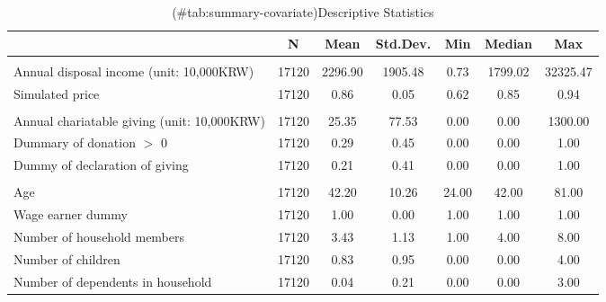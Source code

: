 \begin{table}

\caption{(\#tab:summary-covariate)Descriptive Statistics}
\centering
\fontsize{8}{10}\selectfont
\begin{threeparttable}
\begin{tabular}[t]{lcccccc}
\toprule
  & N & Mean & Std.Dev. & Min & Median & Max\\
\midrule
\addlinespace[0.3em]
\multicolumn{7}{l}{\textit{Income and giving price}}\\
\hspace{1em}Annual disposal income (unit: 10,000KRW) & 17120 & \num{2296.90} & \num{1905.48} & \num{0.73} & \num{1799.02} & \num{32325.47}\\
\hspace{1em}Simulated price & 17120 & \num{0.86} & \num{0.05} & \num{0.62} & \num{0.85} & \num{0.94}\\
\addlinespace[0.3em]
\multicolumn{7}{l}{\textit{Charitable giving}}\\
\hspace{1em}Annual chariatable giving (unit: 10,000KRW) & 17120 & \num{25.35} & \num{77.53} & \num{0.00} & \num{0.00} & \num{1300.00}\\
\hspace{1em}Dummary of donation $>$ 0 & 17120 & \num{0.29} & \num{0.45} & \num{0.00} & \num{0.00} & \num{1.00}\\
\hspace{1em}Dummy of declaration of giving & 17120 & \num{0.21} & \num{0.41} & \num{0.00} & \num{0.00} & \num{1.00}\\
\addlinespace[0.3em]
\multicolumn{7}{l}{\textit{Demographics}}\\
\hspace{1em}Age & 17120 & \num{42.20} & \num{10.26} & \num{24.00} & \num{42.00} & \num{81.00}\\
\hspace{1em}Wage earner dummy & 17120 & \num{1.00} & \num{0.00} & \num{1.00} & \num{1.00} & \num{1.00}\\
\hspace{1em}Number of household members & 17120 & \num{3.43} & \num{1.13} & \num{1.00} & \num{4.00} & \num{8.00}\\
\hspace{1em}Number of children & 17120 & \num{0.83} & \num{0.95} & \num{0.00} & \num{0.00} & \num{4.00}\\
\hspace{1em}Number of dependents in household & 17120 & \num{0.04} & \num{0.21} & \num{0.00} & \num{0.00} & \num{3.00}\\

\end{tabular}
\end{threeparttable}
\end{table}
